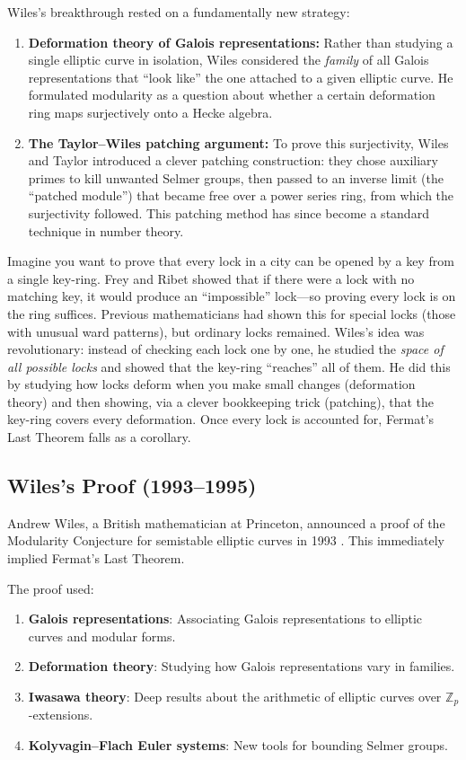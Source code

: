 Wiles's breakthrough rested on a fundamentally new strategy:
\begin{enumerate}
\item \textbf{Deformation theory of Galois representations:} Rather than studying a single elliptic curve in isolation, Wiles considered the \emph{family} of all Galois representations that ``look like'' the one attached to a given elliptic curve. He formulated modularity as a question about whether a certain deformation ring maps surjectively onto a Hecke algebra.
\item \textbf{The Taylor--Wiles patching argument:} To prove this surjectivity, Wiles and Taylor introduced a clever patching construction: they chose auxiliary primes to kill unwanted Selmer groups, then passed to an inverse limit (the ``patched module'') that became free over a power series ring, from which the surjectivity followed. This patching method has since become a standard technique in number theory.
\end{enumerate}

Imagine you want to prove that every lock in a city can be opened by a key from a single key-ring. Frey and Ribet showed that if there were a lock with no matching key, it would produce an ``impossible'' lock---so proving every lock is on the ring suffices. Previous mathematicians had shown this for special locks (those with unusual ward patterns), but ordinary locks remained. Wiles's idea was revolutionary: instead of checking each lock one by one, he studied the \emph{space of all possible locks} and showed that the key-ring ``reaches'' all of them. He did this by studying how locks deform when you make small changes (deformation theory) and then showing, via a clever bookkeeping trick (patching), that the key-ring covers every deformation. Once every lock is accounted for, Fermat's Last Theorem falls as a corollary.

\bigskip

\subsection{Wiles's Proof (1993--1995)}

Andrew Wiles, a British mathematician at Princeton, announced a proof of the Modularity Conjecture for semistable elliptic curves in 1993 \cite{wiles1995}. This immediately implied Fermat's Last Theorem.

The proof used:

\begin{enumerate}
\item \textbf{Galois representations}: Associating Galois representations to elliptic curves and modular forms.
\item \textbf{Deformation theory}: Studying how Galois representations vary in families.
\item \textbf{Iwasawa theory}: Deep results about the arithmetic of elliptic curves over $\mathbb{Z}_p$-extensions.
\item \textbf{Kolyvagin--Flach Euler systems}: New tools for bounding Selmer groups.
\end{enumerate}

